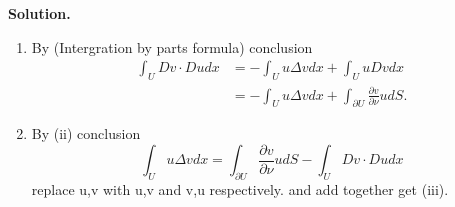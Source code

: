 \documentclass[a4paper]{book}
\newenvironment{solution}%
{\noindent\textbf{Solution.}}%
{\qedhere}
\numberwithin{equation}{chapter}
\theoremstyle{definition}
\begin{document}
\begin{multicols}{2}
\begin{solution}
\begin{enumerate}[i]
		\item  By (Intergration by parts formula) conclusion
		\begin{equation}\nonumber
			\begin{aligned}
			\int_U Dv \cdot Du dx &= - \int_U u \Delta v dx + \int_U u Dv dx  \\
			&=  - \int_U u \Delta v dx +  \int_{\partial U } \frac{\partial v}{\partial \nu} u dS.
			\end{aligned}
		\end{equation}
		
		\item  By (ii) conclusion 
		\begin{equation}\nonumber
			\int_U u \Delta v dx =  \int_{\partial U } \frac{\partial v}{\partial \nu} u dS -	\int_U Dv \cdot Du dx
		\end{equation}
		replace u,v with u,v and v,u respectively. and add together get (iii).
	\end{enumerate}
\end{solution}
\end{multicols}
\end{document}

